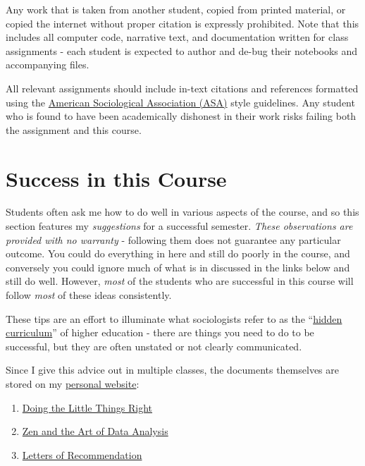 \documentclass[]{book}
\providecommand{\tightlist}{%
  \setlength{\itemsep}{0pt}\setlength{\parskip}{0pt}}
\begin{document}
Any work that is taken from another student, copied from printed material, or copied the internet without proper citation is expressly prohibited. Note that this includes all computer code, narrative text, and documentation written for class assignments - each student is expected to author and de-bug their notebooks and accompanying files.

All relevant assignments should include in-text citations and references formatted using the \href{https://owl.english.purdue.edu/owl/resource/583/1/}{American Sociological Association (ASA)} style guidelines. Any student who is found to have been academically dishonest in their work risks failing both the assignment and this course.

\hypertarget{success-in-this-course}{%
\chapter{Success in this Course}\label{success-in-this-course}}

Students often ask me how to do well in various aspects of the course, and so this section features my \emph{suggestions} for a successful semester. \emph{These observations are provided with no warranty} - following them does not guarantee any particular outcome. You could do everything in here and still do poorly in the course, and conversely you could ignore much of what is in discussed in the links below and still do well. However, \emph{most} of the students who are successful in this course will follow \emph{most} of these ideas consistently.

These tips are an effort to illuminate what sociologists refer to as the ``\href{https://books.google.com/books?hl=en\&lr=\&id=5r-TAgAAQBAJ\&oi=fnd\&pg=PP1\&dq=hidden+curriculum\#v=onepage\&q=hidden\%20curriculum\&f=false}{hidden curriculum}'' of higher education - there are things you need to do to be successful, but they are often unstated or not clearly communicated.

Since I give this advice out in multiple classes, the documents themselves are stored on my \href{https://chris-prener.github.io}{personal website}:

\begin{enumerate}
\def\labelenumi{\arabic{enumi}.}
\tightlist
\item
  \href{https://chris-prener.github.io/resources/little-things/}{Doing the Little Things Right}
\item
  \href{https://chris-prener.github.io/resources/zen/}{Zen and the Art of Data Analysis}
\item
  \href{https://chris-prener.github.io/resources/letters/}{Letters of Recommendation}
\end{enumerate}
\end{document}
